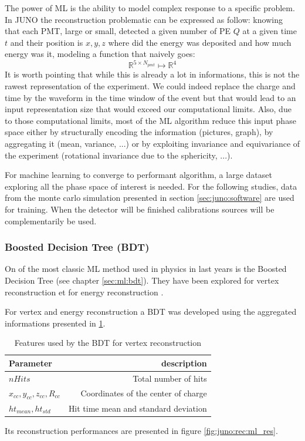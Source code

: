 \documentclass[../main.tex]{subfiles}
\begin{document}
The power of ML is the ability to model complex response to a specific problem. In JUNO the reconstruction problematic can be expressed as follow: knowing that each PMT, large or small, detected a given number of PE $Q$ at a given time $t$ and their position is $x,y,z$ where did the energy was deposited and how much energy was it, modeling a function that naively goes:
\begin{equation}
    \mathbb{R}^{5 \times N_{pmt}} \longmapsto \mathbb{R}^4
\end{equation}
It is worth pointing that while this is already a lot in informations, this is not the rawest representation of the experiment. We could indeed replace the charge and time by the waveform in the time window of the event but that would lead to an input representation size that would exceed our computational limits. Also, due to those computational limits, most of the ML algorithm reduce this input phase space either by structurally encoding the information (pictures, graph), by aggregating it (mean, variance, ...) or by exploiting invariance and equivariance of the experiment (rotational invariance due to the sphericity, ...).

For machine learning to converge to performant algorithm, a large dataset exploring all the phase space of interest is needed. For the following studies, data from the monte carlo simulation presented in section \ref{sec:juno:software} are used for training. When the detector will be finished calibrations sources will be complementarily be used.

\subsubsection{Boosted Decision Tree (BDT)}

On of the most classic ML method used in physics in last years is the Boosted Decision Tree (see chapter \ref{sec:ml:bdt}). They have been explored for vertex reconstruction \cite{qian_vertex_2021} et for energy reconstruction \cite{qian_vertex_2021, gavrikov_energy_2022}.

For vertex and energy reconstruction a BDT was developed using the aggregated informations presented in \ref{tab:juno:rec:bdt_vertex}.

\begin{table}[ht]
  \centering
  \begin{tabular}{l|r}
    Parameter & description \\
    \hline
    $nHits$ & Total number of hits \\
    $x_{cc}, y_{cc}, z_{cc}, R_{cc}$ & Coordinates of the center of charge \\
    $ht_{mean}, ht_{std}$ & Hit time mean and standard deviation
  \end{tabular}
  \caption{Features used by the BDT for vertex reconstruction}
  \label{tab:juno:rec:bdt_vertex}
\end{table}
Its reconstruction performances are presented in figure \ref{fig:juno:rec:ml_res}.
\end{document}
